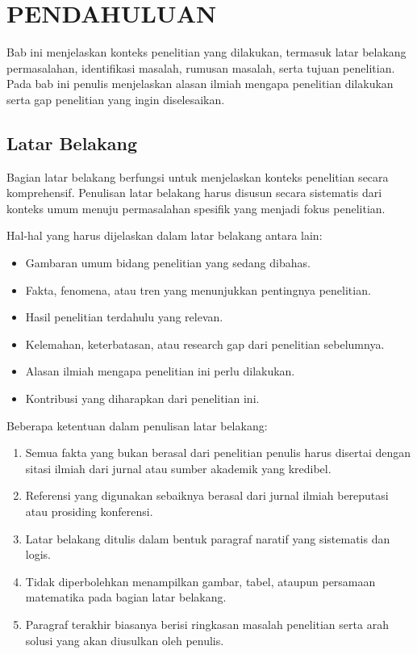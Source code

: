 \chapter{PENDAHULUAN}

Bab ini menjelaskan konteks penelitian yang dilakukan, termasuk latar belakang
permasalahan, identifikasi masalah, rumusan masalah, serta tujuan penelitian.
Pada bab ini penulis menjelaskan alasan ilmiah mengapa penelitian dilakukan
serta gap penelitian yang ingin diselesaikan.

\section{Latar Belakang}

Bagian latar belakang berfungsi untuk menjelaskan konteks penelitian secara
komprehensif. Penulisan latar belakang harus disusun secara sistematis dari
konteks umum menuju permasalahan spesifik yang menjadi fokus penelitian.

Hal-hal yang harus dijelaskan dalam latar belakang antara lain:

\begin{itemize}
\item Gambaran umum bidang penelitian yang sedang dibahas.
\item Fakta, fenomena, atau tren yang menunjukkan pentingnya penelitian.
\item Hasil penelitian terdahulu yang relevan.
\item Kelemahan, keterbatasan, atau research gap dari penelitian sebelumnya.
\item Alasan ilmiah mengapa penelitian ini perlu dilakukan.
\item Kontribusi yang diharapkan dari penelitian ini.
\end{itemize}

Beberapa ketentuan dalam penulisan latar belakang:

\begin{enumerate}
\item Semua fakta yang bukan berasal dari penelitian penulis harus disertai
dengan sitasi ilmiah dari jurnal atau sumber akademik yang kredibel.
\item Referensi yang digunakan sebaiknya berasal dari jurnal ilmiah
bereputasi atau prosiding konferensi.
\item Latar belakang ditulis dalam bentuk paragraf naratif yang sistematis
dan logis.
\item Tidak diperbolehkan menampilkan gambar, tabel, ataupun persamaan
matematika pada bagian latar belakang.
\item Paragraf terakhir biasanya berisi ringkasan masalah penelitian serta
arah solusi yang akan diusulkan oleh penulis.
\end{enumerate}

